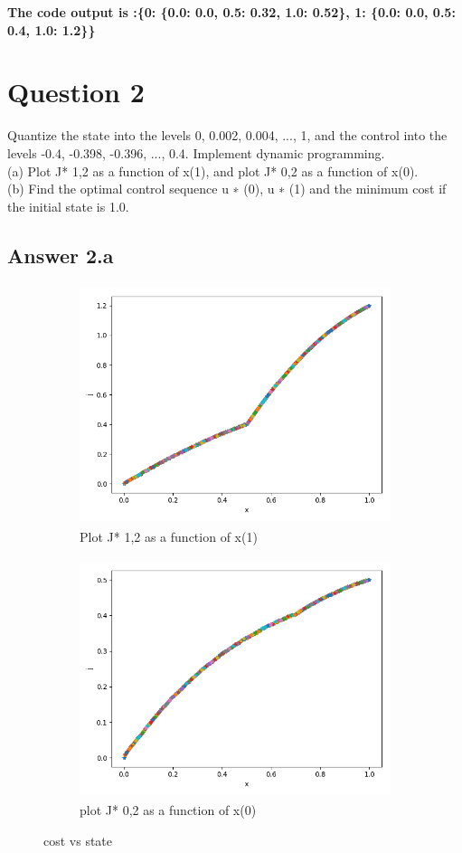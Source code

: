 \documentclass[12pt]{article}
\begin{document}
{\bfseries The code output is :\{0: \{0.0: 0.0, 0.5: 0.32, 1.0: 0.52\}, 1: \{0.0: 0.0, 0.5: 0.4, 1.0: 1.2\}\} \\}


\section*{Question 2}

{
Quantize the state into the levels 0, 0.002, 0.004, ..., 1, and the control into the levels -0.4,
-0.398, -0.396, ..., 0.4. Implement dynamic programming.\\
(a) Plot J* 1,2 as a function of x(1), and plot J* 0,2 as a function of x(0).\\
(b) Find the optimal control sequence u ∗ (0), u ∗ (1) and the minimum cost if the initial state
is 1.0.
}

\subsection*{Answer 2.a}


\begin{figure}[H]

\begin{subfigure}{}
\includegraphics[width=10cm, height=7cm, centre]{2ax(1).png} 
\caption{Plot J* 1,2 as a function of x(1)}
\label{fig:subim1}
\end{subfigure}
\begin{subfigure}{}
\includegraphics[width=10cm, height=7cm, centre]{2ax(0).png}
\caption{plot J* 0,2 as a function of x(0)}
\label{fig:subim2}
\end{subfigure}

\caption{cost vs state}
\label{fig:image2}
\end{figure}
\end{document}
